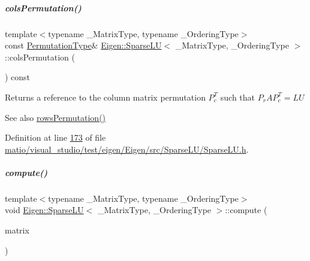 \mbox{\label{group___sparse_l_u___module_ab7b0d15d0d9fd1faa164298f92ca59cd}} 
\subparagraph{\texorpdfstring{cols\+Permutation()}{colsPermutation()}\hspace{0.1cm}{\footnotesize\ttfamily [2/2]}}
{\footnotesize\ttfamily template$<$typename \+\_\+\+Matrix\+Type, typename \+\_\+\+Ordering\+Type$>$ \\
const \hyperlink{group___core___module}{Permutation\+Type}\& \hyperlink{group___sparse_l_u___module_class_eigen_1_1_sparse_l_u}{Eigen\+::\+Sparse\+LU}$<$ \+\_\+\+Matrix\+Type, \+\_\+\+Ordering\+Type $>$\+::cols\+Permutation (\begin{DoxyParamCaption}{ }\end{DoxyParamCaption}) const\hspace{0.3cm}{\ttfamily [inline]}}

\begin{DoxyReturn}{Returns}
a reference to the column matrix permutation $ P_c^T $ such that $P_r A P_c^T = L U$ 
\end{DoxyReturn}
\begin{DoxySeeAlso}{See also}
\hyperlink{group___sparse_l_u___module_a691295e65c06df599876d78ac2c7fada}{rows\+Permutation()} 
\end{DoxySeeAlso}


Definition at line \hyperlink{matio_2visual__studio_2test_2eigen_2_eigen_2src_2_sparse_l_u_2_sparse_l_u_8h_source_l00173}{173} of file \hyperlink{matio_2visual__studio_2test_2eigen_2_eigen_2src_2_sparse_l_u_2_sparse_l_u_8h_source}{matio/visual\+\_\+studio/test/eigen/\+Eigen/src/\+Sparse\+L\+U/\+Sparse\+L\+U.\+h}.

\mbox{\label{group___sparse_l_u___module_a96a8dcb02015ab9be5777d4ba9173266}} 
\subparagraph{\texorpdfstring{compute()}{compute()}\hspace{0.1cm}{\footnotesize\ttfamily [1/2]}}
{\footnotesize\ttfamily template$<$typename \+\_\+\+Matrix\+Type, typename \+\_\+\+Ordering\+Type$>$ \\
void \hyperlink{group___sparse_l_u___module_class_eigen_1_1_sparse_l_u}{Eigen\+::\+Sparse\+LU}$<$ \+\_\+\+Matrix\+Type, \+\_\+\+Ordering\+Type $>$\+::compute (\begin{DoxyParamCaption}\item[{const Matrix\+Type \&}]{matrix }\end{DoxyParamCaption})\hspace{0.3cm}{\ttfamily [inline]}}

